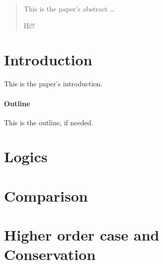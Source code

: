 \documentclass[12pt]{article}
\begin{document}
\maketitle

\begin{abstract}
This is the paper's abstract \ldots

Hi!!

\end{abstract}

\section{Introduction}
This is the paper's introduction.

\paragraph{Outline}
This is the outline, if needed.

\section{Logics}


\section{Comparison}


\section{Higher order case and Conservation}




\end{document}
